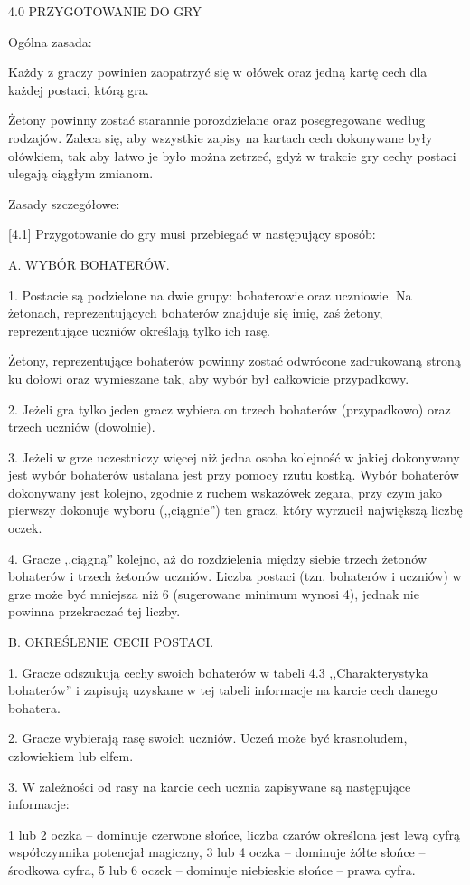 4.0 PRZYGOTOWANIE DO GRY

Ogólna zasada:

Każdy z graczy powinien zaopatrzyć się w ołówek oraz jedną kartę cech dla każdej postaci, którą gra.

Żetony powinny zostać starannie porozdzielane oraz posegregowane według rodzajów.
Zaleca się, aby wszystkie zapisy na kartach cech dokonywane były ołówkiem, tak aby łatwo je było można zetrzeć, gdyż w trakcie gry cechy postaci ulegają ciągłym zmianom.

Zasady szczegółowe:

[4.1] Przygotowanie do gry musi przebiegać w następujący sposób:

A. WYBÓR BOHATERÓW.

1.
Postacie są podzielone na dwie grupy: bohaterowie oraz uczniowie.
Na żetonach, reprezentujących bohaterów znajduje się imię, zaś żetony, reprezentujące uczniów określają tylko ich rasę.

Żetony, reprezentujące bohaterów powinny zostać odwrócone zadrukowaną stroną ku dołowi oraz wymieszane tak, aby wybór był całkowicie przypadkowy.

2.
Jeżeli gra tylko jeden gracz wybiera on trzech bohaterów (przypadkowo) oraz trzech uczniów (dowolnie).

3.
Jeżeli w grze uczestniczy więcej niż jedna osoba kolejność w jakiej dokonywany jest wybór bohaterów ustalana jest przy pomocy rzutu kostką.
Wybór bohaterów dokonywany jest kolejno, zgodnie z ruchem wskazówek zegara, przy czym jako pierwszy dokonuje wyboru (,,ciągnie'') ten gracz, który wyrzucił największą liczbę oczek.

4.
Gracze ,,ciągną'' kolejno, aż do rozdzielenia między siebie trzech żetonów bohaterów i trzech żetonów uczniów.
Liczba postaci (tzn. bohaterów i uczniów) w grze może być mniejsza niż 6 (sugerowane minimum wynosi 4), jednak nie powinna przekraczać tej liczby.

B. OKREŚLENIE CECH POSTACI.

1.
Gracze odszukują cechy swoich bohaterów w tabeli 4.3 ,,Charakterystyka bohaterów'' i zapisują uzyskane w tej tabeli informacje na karcie cech danego bohatera.

2.
Gracze wybierają rasę swoich uczniów.
Uczeń może być krasnoludem, człowiekiem lub elfem.

3.
W zależności od rasy na karcie cech ucznia zapisywane są następujące informacje:

1 lub 2 oczka – dominuje czerwone słońce, liczba czarów określona jest lewą cyfrą współczynnika potencjał magiczny, 3 lub 4 oczka – dominuje żółte słońce – środkowa cyfra, 5 lub 6 oczek – dominuje niebieskie słońce – prawa cyfra.

